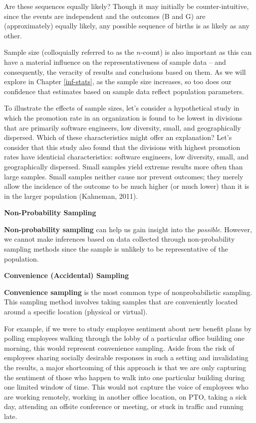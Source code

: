 \documentclass[]{book}
\begin{document}
Are these sequences equally likely? Though it may initially be counter-intuitive, since the events are independent and the outcomes (B and G) are (approximately) equally likely, any possible sequence of births is as likely as any other.

Sample size (colloquially referred to as the \(n\)-count) is also important as this can have a material influence on the representativeness of sample data -- and consequently, the veracity of results and conclusions based on them. As we will explore in Chapter \ref{inf-stats}, as the sample size increases, so too does our confidence that estimates based on sample data reflect population parameters.

To illustrate the effects of sample sizes, let's consider a hypothetical study in which the promotion rate in an organization is found to be lowest in divisions that are primarily software engineers, low diversity, small, and geographically dispersed. Which of these characteristics might offer an explanation? Let's consider that this study also found that the divisions with highest promotion rates have identicial characteristics: software engineers, low diversity, small, and geographically dispersed.
Small samples yield extreme results more often than large samples. Small samples neither cause nor prevent outcomes; they merely allow the incidence of the outcome to be much higher (or much lower) than it is in the larger population (Kahneman, 2011).

\textbf{Non-Probability Sampling}

\textbf{Non-probability sampling} can help us gain insight into the \emph{possible}. However, we cannot make inferences based on data collected through non-probability sampling methods since the sample is unlikely to be representative of the population.

\textbf{Convenience (Accidental) Sampling}

\textbf{Convenience sampling} is the most common type of nonprobabilistic sampling. This sampling method involves taking samples that are conveniently located around a specific location (physical or virtual).

For example, if we were to study employee sentiment about new benefit plans by polling employees walking through the lobby of a particular office building one morning, this would represent convenience sampling. Aside from the risk of employees sharing socially desirable responses in such a setting and invalidating the results, a major shortcoming of this approach is that we are only capturing the sentiment of those who happen to walk into one particular building during one limited window of time. This would not capture the voice of employees who are working remotely, working in another office location, on PTO, taking a sick day, attending an offsite conference or meeting, or stuck in traffic and running late.
\end{document}
